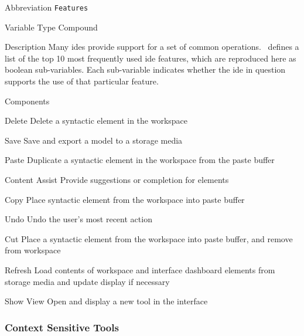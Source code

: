 \begin{AlignedDesc}
  \item[Abbreviation] \texttt{Features}

  \item[Variable Type] Compound

  \item[Description] Many \acp{ide} provide support for a set of common
  operations.~\cite{murphy2006} defines a list of the top 10 most
  frequently used \ac{ide} features, which are reproduced here as boolean
  sub-variables. Each sub-variable indicates whether the \ac{ide} in
  question supports the use of that particular feature.

  \item[Components]

  \begin{AlignedDesc}
    \item[Delete] Delete a syntactic element in the workspace
    \item[Save] Save and export a model to a storage media
    \item[Paste] Duplicate a syntactic element in the workspace from the
    paste buffer
    \item[Content Assist] Provide suggestions or completion for elements
    \item[Copy] Place syntactic element from the workspace into paste
    buffer
    \item[Undo] Undo the user's most recent action
    \item[Cut] Place a syntactic element from the workspace into paste
    buffer, and remove from workspace
    \item[Refresh] Load contents of workspace and interface dashboard
    elements from storage media and update display if necessary
    \item[Show View] Open and display a new tool in the interface
  \end{AlignedDesc}

\end{AlignedDesc}

\subsubsection{Context Sensitive Tools}
\label{subsubsec:context}

